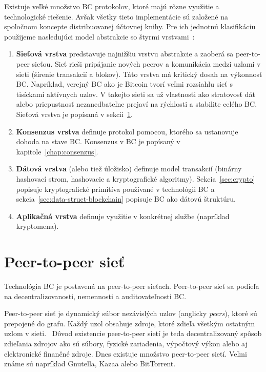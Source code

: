 Existuje veľké množstvo BC protokolov, ktoré majú rôzne využitie a technologické riešenie. Avšak všetky tieto implementácie sú založené na spoločnom koncepte distribuovanej účtovnej knihy. Pre ich jednotnú klasifikáciu použijeme nasledujúci model abstrakcie so štyrmi vrstvami~\cite{homoliakBlockchain}:

\begin{enumerate}
	\item \textbf{Sieťová vrstva} predstavuje najnižšiu vrstvu abstrakcie a zaoberá sa peer-to-peer sieťou. Sieť rieši pripájanie nových peerov a komunikácia medzi uzlami v sieti (šírenie transakcií a blokov). Táto vrstva má kritický dosah na výkonnosť BC. Napríklad, verejný BC ako je Bitcoin tvorí veľmi rozsiahlu sieť s tisíckami aktívnych uzlov. V takejto sieti sa už vlastnosti ako stratovosť dát alebo priepustnosť nezanedbateľne prejaví na rýchlosti a stabilite celého BC. Sieťová vrstva je popísaná v sekcii~\ref{sec:p2p}.~\cite{fanPerfEval}
	\item \textbf{Konsenzus vrstva} definuje protokol pomocou, ktorého sa ustanovuje dohoda na stave BC. Konsenzus v BC je popísaný v kapitole~\ref{chap:consenzus}.
	\item \textbf{Dátová vrstva} (alebo tiež úložisko) definuje model transakcií (binárny hashovací strom, hashovacie a kryptografické algoritmy). Sekcia~\ref{sec:crypto} popisuje kryptografické primitíva používané v technológii BC a sekcia~\ref{sec:data-struct-blockchain} popisuje BC ako dátovú štruktúru.
	\item \textbf{Aplikačná vrstva} definuje využitie v konkrétnej službe (napríklad kryptomena).
\end{enumerate}

\section{Peer-to-peer sieť}\label{sec:p2p}

Technológia BC je postavená na peer-to-peer sieťach. Peer-to-peer sieť sa podieľa na decentralizovanosti, nemennosti a auditovateľnosti BC. 

Peer-to-peer sieť je dynamický súbor nezávislých uzlov (anglicky \textit{peers}), ktoré sú prepojené do grafu. Každý uzol obsahuje zdroje, ktoré zdieľa všetkým ostatným uzlom v sieti.~\cite{p2pBuford, p2pSchollmeier} Dôvod existencie peer-to-peer sietí je teda decentralizovaný spôsob zdieľania zdrojov ako sú súbory, fyzické zariadenia, výpočtový výkon alebo aj elektronické finančné zdroje. Dnes existuje množstvo peer-to-peer sietí. Veľmi známe sú napríklad Gnutella, Kazaa alebo BitTorrent.~\cite{p2pEssence}

